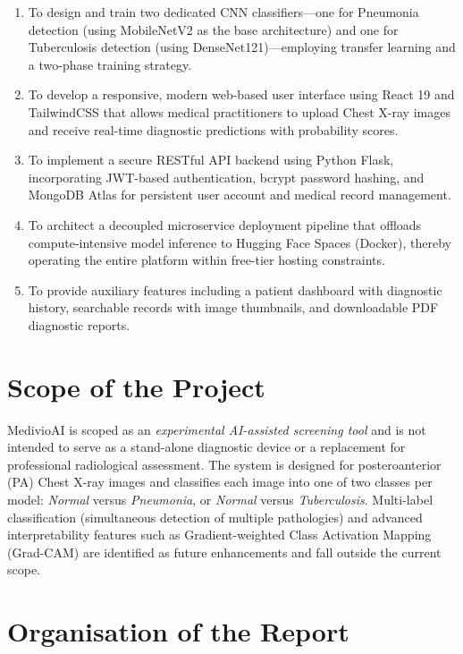 \documentclass[12pt, a4paper, oneside]{report}
\begin{document}
\begin{enumerate}[label=\arabic*.]
    \item To design and train two dedicated CNN classifiers---one for Pneumonia detection (using MobileNetV2 as the base architecture) and one for Tuberculosis detection (using DenseNet121)---employing transfer learning and a two-phase training strategy.

    \item To develop a responsive, modern web-based user interface using React 19 and TailwindCSS that allows medical practitioners to upload Chest X-ray images and receive real-time diagnostic predictions with probability scores.

    \item To implement a secure RESTful API backend using Python Flask, incorporating JWT-based authentication, bcrypt password hashing, and MongoDB Atlas for persistent user account and medical record management.

    \item To architect a decoupled microservice deployment pipeline that offloads compute-intensive model inference to Hugging Face Spaces (Docker), thereby operating the entire platform within free-tier hosting constraints.

    \item To provide auxiliary features including a patient dashboard with diagnostic history, searchable records with image thumbnails, and downloadable PDF diagnostic reports.
\end{enumerate}

\section{Scope of the Project}
\label{sec:scope}

MedivioAI is scoped as an \textit{experimental AI-assisted screening tool} and is not intended to serve as a stand-alone diagnostic device or a replacement for professional radiological assessment. The system is designed for posteroanterior (PA) Chest X-ray images and classifies each image into one of two classes per model: \textit{Normal} versus \textit{Pneumonia}, or \textit{Normal} versus \textit{Tuberculosis}. Multi-label classification (simultaneous detection of multiple pathologies) and advanced interpretability features such as Gradient-weighted Class Activation Mapping (Grad-CAM) are identified as future enhancements and fall outside the current scope.

\section{Organisation of the Report}
\label{sec:organisation}
\end{document}
